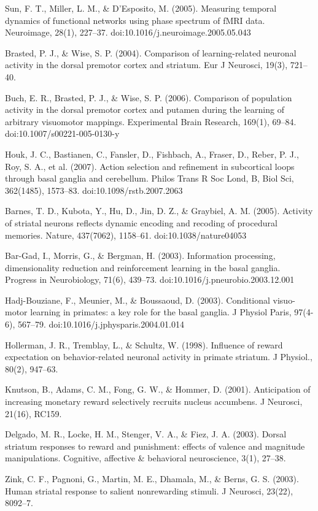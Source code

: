 Sun, F. T., Miller, L. M., & D'Esposito, M. (2005). Measuring temporal dynamics of functional networks using phase spectrum of fMRI data. Neuroimage, 28(1), 227–37. doi:10.1016/j.neuroimage.2005.05.043

Brasted, P. J., & Wise, S. P. (2004). Comparison of learning-related neuronal activity in the dorsal premotor cortex and striatum. Eur J Neurosci, 19(3), 721–40.

Buch, E. R., Brasted, P. J., & Wise, S. P. (2006). Comparison of population activity in the dorsal premotor cortex and putamen during the learning of arbitrary visuomotor mappings. Experimental Brain Research, 169(1), 69–84. doi:10.1007/s00221-005-0130-y

Houk, J. C., Bastianen, C., Fansler, D., Fishbach, A., Fraser, D., Reber, P. J., Roy, S. A., et al. (2007). Action selection and refinement in subcortical loops through basal ganglia and cerebellum. Philos Trans R Soc Lond, B, Biol Sci, 362(1485), 1573–83. doi:10.1098/rstb.2007.2063

Barnes, T. D., Kubota, Y., Hu, D., Jin, D. Z., & Graybiel, A. M. (2005). Activity of striatal neurons reflects dynamic encoding and recoding of procedural memories. Nature, 437(7062), 1158–61. doi:10.1038/nature04053

Bar-Gad, I., Morris, G., & Bergman, H. (2003). Information processing, dimensionality reduction and reinforcement learning in the basal ganglia. Progress in Neurobiology, 71(6), 439–73. doi:10.1016/j.pneurobio.2003.12.001

Hadj-Bouziane, F., Meunier, M., & Boussaoud, D. (2003). Conditional visuo-motor learning in primates: a key role for the basal ganglia. J Physiol Paris, 97(4-6), 567–79. doi:10.1016/j.jphysparis.2004.01.014

Hollerman, J. R., Tremblay, L., & Schultz, W. (1998). Influence of reward expectation on behavior-related neuronal activity in primate striatum. J Physiol., 80(2), 947–63.

Knutson, B., Adams, C. M., Fong, G. W., & Hommer, D. (2001). Anticipation of increasing monetary reward selectively recruits nucleus accumbens. J Neurosci, 21(16), RC159.

Delgado, M. R., Locke, H. M., Stenger, V. A., & Fiez, J. A. (2003). Dorsal striatum responses to reward and punishment: effects of valence and magnitude manipulations. Cognitive, affective & behavioral neuroscience, 3(1), 27–38.

Zink, C. F., Pagnoni, G., Martin, M. E., Dhamala, M., & Berns, G. S. (2003). Human striatal response to salient nonrewarding stimuli. J Neurosci, 23(22), 8092–7.

